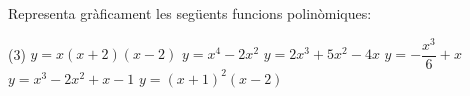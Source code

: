 \begin{mylist}
	\exer Representa gràficament les següents funcions polinòmiques:
	\begin{tasks}(3)
		\task $y=x(x+2)(x-2)$
		\task $y=x^4-2x^2$
		\task $y=2x^3+5x^2-4x$
		\task $y=-\dfrac{x^3}{6}+x$
		\task $y=x^3-2x^2+x-1$
		\task $y=(x+1)^2 (x-2)$
	\end{tasks}

	

\end{mylist}
